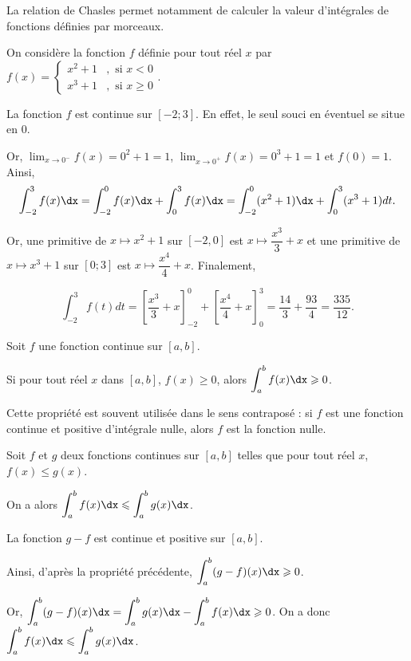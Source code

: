 \documentclass[11pt,fleqn, openany]{book} %
\begin{document}
 La relation de Chasles permet notamment de calculer la valeur d'intégrales de fonctions définies par morceaux.
 
\begin{example} On considère la fonction $f$ définie pour tout réel $x$ par \renewcommand{\arraystretch}{1}$f(x)=\left\{\begin{array}{ll} x^2+1&,\text{ si }x<0\\ x^3+1&,\text{ si }x\geqslant 0\end{array}\right.$.

La fonction $f$ est continue sur $[-2;3]$. En effet, le seul souci en éventuel se situe en 0. 

Or, $\displaystyle\lim_{x\to 0^-} f(x)= 0^2+1=1$, $\displaystyle\lim_{x\to 0^+} f(x)= 0^3+1=1$ et $f(0)=1$. Ainsi,
 \[\displaystyle\int_{-2}^3 f(x)\dx=\displaystyle\int_{-2}^0 f(x)\dx+\displaystyle\int_{0}^3 f(x)\dx=\displaystyle\int_{-2}^0 (x^2+1)\dx+\displaystyle\int_{0}^3 (x^3+1)dt.\]
 
 Or, une primitive de $x\mapsto x^2+1$ sur $[-2,0]$ est $x\mapsto \dfrac{x^3}{3}+x$ et une primitive de $x\mapsto x^3+1$ sur $[0;3]$ est $x\mapsto \dfrac{x^4}{4}+x$. Finalement,
 
 \[\displaystyle\int_{-2}^3 f(t)dt=\left[\dfrac{x^3}{3}+x\right]_{-2}^0+\left[\dfrac{x^4}{4}+x\right]_0^3=\dfrac{14}{3}+\dfrac{93}{4}=\dfrac{335}{12}.\]\vspace{-0.5cm}\end{example}



\begin{proposition} Soit $f$ une fonction continue sur $[a,b]$.

Si pour tout réel $x$ dans $[a,b]$, $f(x)\geqslant 0$, alors $\displaystyle\int_{a}^b f(x)\dx \geqslant 0$.
\end{proposition}

Cette propriété est souvent utilisée dans le sens contraposé : si $f$ est une fonction continue et positive d'intégrale nulle, alors $f$ est la fonction nulle.

\begin{proposition} Soit $f$ et $g$ deux fonctions continues sur $[a,b]$ telles que pour tout réel $x$, $f(x)\leqslant g(x)$.

On a alors $\displaystyle\int_{a}^b f(x)\dx\leqslant \displaystyle\int_{a}^b g(x)\dx$.\end{proposition}

\begin{demonstration} La fonction $g-f$ est continue et positive sur $[a,b]$. 

Ainsi, d'après la propriété précédente, $\displaystyle\int_{a}^b(g- f)(x)\dx \geqslant 0$. 

Or, $\displaystyle\int_{a}^b (g-f)(x)\dx=\displaystyle\int_{a}^b g(x)\dx-\displaystyle\int_{a}^b f(x)\dx \geqslant 0$. On a donc $\displaystyle\int_{a}^b f(x)\dx \leqslant \displaystyle\int_{a}^b g(x)\dx$.\end{demonstration}
\end{document}
